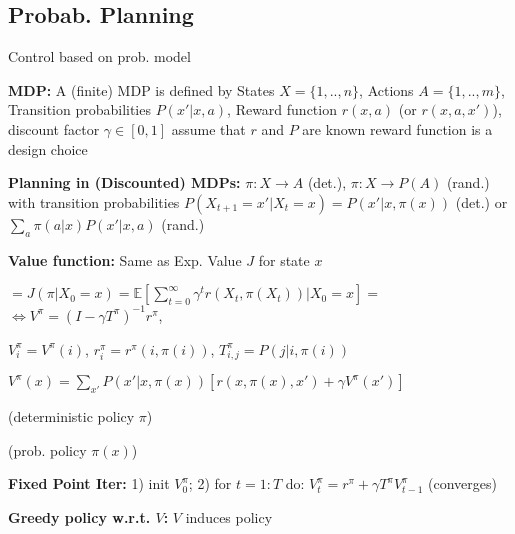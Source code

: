 \subsection*{Probab. Planning}  Control based on prob. model

\textbf{MDP:} A (finite) MDP is defined by
States $X = \{1,..,n\}$,
Actions $A = \{1,..,m\}$,
Transition probabilities $P(x' | x,a)$,
Reward function $r(x,a)$ (or $r(x,a,x')$),
discount factor $\gamma \in [0,1]$
assume that $r$ and $P$ are known
reward function is a design choice

\textbf{Planning in (Discounted) MDPs:} \;  $\pi: X \rightarrow A$ (det.), $\pi: X \rightarrow P(A)$ (rand.)  with transition probabilities $P(X_{t+1} = x' | X_t = x) = P(x' | x, \pi(x))$ (det.) or $\sum_a \pi(a | x) P(x' | x, a)$ (rand.)

\textbf{Value function:} \; Same as Exp. Value $J$ for state $x$ 

{\fontsize{9}{6}\selectfont {} $ = J(\pi | X_0 = x)=\mathbb{E}[\sum_{t=0}^{\infty} \gamma^t r(X_t, \pi(X_t)) | X_0 = x]=$} \\ 
{\fontsize{8.5}{6}\selectfont{}$\Leftrightarrow$$V^\pi = (I - \gamma T^\pi)^{-1} r^\pi$}, 

$V_i^\pi = V^\pi(i)$, \; $r_i^\pi = r^\pi(i, \pi(i))$, \; $T_{i,j}^\pi = P(j | i,\pi(i))$

\vspace*{-0.5mm}
\mbox{$V^\pi(x) = \sum_{x'} P(x' | x, \pi(x)) [r(x,\pi(x),x') + \gamma V^\pi(x')]$}

 (deterministic policy $\pi$)

 (prob. policy $\pi(x)$)

\textbf{Fixed Point Iter:} 1) init $V_0^\pi$; 2) for $t=1:T$ do: $V_t^\pi = r^\pi + \gamma T^\pi V_{t-1}^\pi$ (converges)

\textbf{Greedy policy w.r.t. $V$:} $V$ induces policy\\

